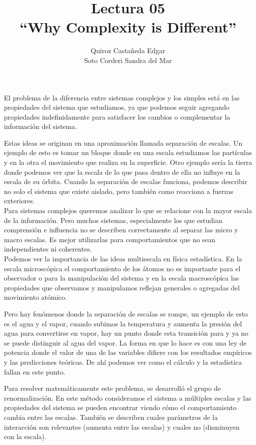 \documentclass[12pt]{extreport}
\title{
	Lectura 05\\ 
	``Why Complexity is Different''}
\author{
	Quiroz Castañeda Edgar \\
	Soto Corderi Sandra del Mar
	}
\makeatletter
\renewcommand{\maketitle}{
	\bgroup\setlength{\parindent}{0pt}

	\begin{flushright}
		\@author
	\end{flushright}

	\begin{flushleft}
		\textbf{\@title}
	\end{flushleft}

	\egroup
}
\makeatother
\begin{document}
	\maketitle
	
	El problema de la diferencia entre sistemas complejos y los simples está en las propiedades del sistema que estudiamos, ya que podemos seguir agregando propiedades indefinidamente para satisfacer los cambios o complementar la información del sistema.
	
	Estas ideas se originan en una aproximación llamada separación de escalas. Un ejemplo de esto es tomar un bloque donde en una escala estudiamos las partículas y en la otra el movimiento que realiza en la superficie.
	Otro ejemplo sería la tierra donde podemos ver que la escala de lo que pasa dentro de ella no influye en la escala de su órbita. Cuando la separación de escalas funciona, podemos describir no solo el sistema que existe aislado, pero también como reacciona a fuerzas exteriores.\\
	
	Para sistemas complejos queremos analizar lo que se relacione con la mayor escala de la información. Pero muchos sistemas, especialmente los que estudian comprensión e influencia no se describen correctamente al separar las micro y macro escalas. Es mejor utilizarlas  para comportamientos que no sean independientes ni coherentes.\\
	
	Podemos ver la importancia de las ideas multiescala en física estadística. En la escala microscópica el comportamiento de los átomos no es importante para el observador o para la manipulación del sistema y en la escala macroscópica las propiedades que observamos y manipulamos reflejan generales o agregadas del movimiento atómico. 
	
	Pero hay fenómenos donde la separación de escalas se rompe, un ejemplo de esto es el agua y el vapor, cuando subimos la temperatura y aumenta la presión del agua para convertirse en vapor, hay un punto donde esta transición para y ya no se puede distinguir al agua del vapor. La forma en que lo hace es con una ley de potencia donde el valor de una de las variables difiere con los resultados empíricos y las predicciones teóricas. De ahí podemos ver como el cálculo y la estadística fallan en este punto.
	
	Para resolver matemáticamente este problema, se desarrolló el grupo de renormalización. En este método  consideramos el sistema a múltiples escalas y las propiedades del sistema se pueden encontrar viendo cómo el comportamiento cambia entre las escalas. También se describen cuales parámetros de la interacción son relevantes (aumenta entre las escalas) y cuales no (disminuyen con la escala). 
	
\end{document}
